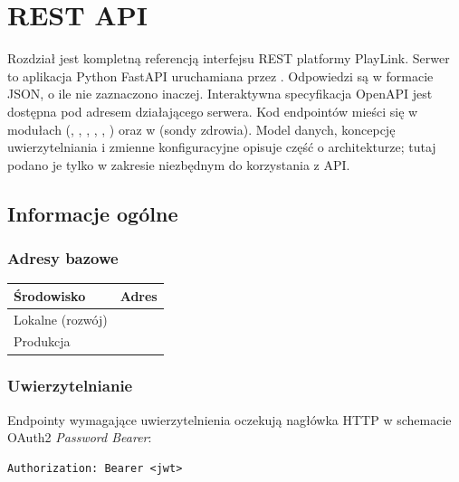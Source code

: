 
\chapter{REST API}
\label{ch:api-rest}

Rozdział jest kompletną referencją interfejsu REST platformy PlayLink. Serwer to aplikacja Python
FastAPI uruchamiana przez . Odpowiedzi są w formacie JSON, o ile nie zaznaczono inaczej.
Interaktywna specyfikacja OpenAPI jest dostępna pod adresem  działającego serwera.
Kod endpointów mieści się w modułach  (, , ,
, , ) oraz w  (sondy zdrowia).
Model danych, koncepcję uwierzytelniania i zmienne konfiguracyjne opisuje część o architekturze;
tutaj podano je tylko w zakresie niezbędnym do korzystania z API.

\section{Informacje ogólne}
\label{sec:api-ogolne}

\subsection{Adresy bazowe}

\begin{tabularx}{\textwidth}{lY}
\toprule
Środowisko & Adres \\
\midrule
Lokalne (rozwój) &  \\
Produkcja &  \\
\bottomrule
\end{tabularx}

\subsection{Uwierzytelnianie}
\label{sec:api-auth}

Endpointy wymagające uwierzytelnienia oczekują nagłówka HTTP  w schemacie
OAuth2 \emph{Password Bearer}:

\begin{lstlisting}
Authorization: Bearer <jwt>
\end{lstlisting}

